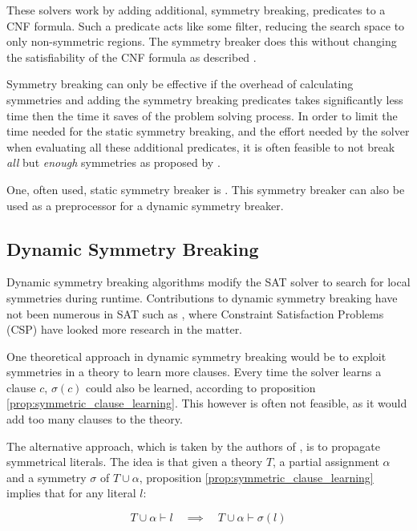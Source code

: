 	These solvers work by adding additional, symmetry breaking, predicates to a CNF 
	formula. Such a predicate acts like some filter, reducing the search space to only 
	non-symmetric regions. The symmetry breaker does this without changing the 
	satisfiability of the CNF formula as described \cite{aloul2003shatter}.

	Symmetry breaking can only be effective if the overhead of calculating symmetries and
	adding the symmetry breaking predicates takes significantly less time then the time it
	saves of the problem solving process. In order to limit the time needed for the static
	symmetry breaking, and the effort needed by the solver when evaluating all these
	additional predicates, it is often feasible to not break \emph{all} but \emph{enough} 
	symmetries as proposed by \cite{aloul2003shatter}.
	
	One, often used, static symmetry breaker is \cite{aloul2003shatter}. This symmetry
	breaker can also be used as a preprocessor for a dynamic symmetry breaker.

\subsection{Dynamic Symmetry Breaking}
	Dynamic symmetry breaking algorithms modify the SAT solver to search for local
	symmetries during runtime. Contributions to dynamic symmetry breaking have not been
	numerous in SAT such as \cite{sabharwal2005symchaff}, where Constraint Satisfaction
	Problems (CSP) have looked more research in the matter.

	One theoretical approach in dynamic symmetry breaking would be to exploit symmetries in
	a theory to learn more clauses.
	Every time the solver learns a clause $c$, $\sigma(c)$ could also be learned, according
	to proposition \ref{prop:symmetric_clause_learning}.
	This however is often not feasible, as it would add too many clauses to the theory.

	The alternative approach, which is taken by the authors of
	\cite{devriendt2012symmetry}, is to propagate symmetrical literals.
	The idea is that given a theory $T$, a partial assignment $\alpha$ and a symmetry
	$\sigma$ of $T \cup \alpha$, proposition \ref{prop:symmetric_clause_learning} implies
	that for any literal $l$:

	\begin{equation}
		T \cup \alpha \vdash l \quad
		\implies
		\quad T \cup \alpha \vdash \sigma(l)
	\end{equation}

